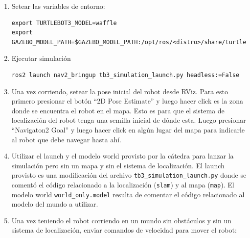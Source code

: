 \documentclass[tp]{lcc}
\begin{document}
\begin{enumerate}

\item Setear las variables de entorno:

\begin{lstlisting}[style=bash] 
export TURTLEBOT3_MODEL=waffle
export GAZEBO_MODEL_PATH=$GAZEBO_MODEL_PATH:/opt/ros/<distro>/share/turtlebot3_gazebo/models
\end{lstlisting}
	\item Ejecutar simulación

\begin{lstlisting}[style=bash] 
ros2 launch nav2_bringup tb3_simulation_launch.py headless:=False
\end{lstlisting}


	\item Una vez corriendo, setear la pose inicial del robot desde RViz. Para esto primero presionar el botón ``2D Pose Estimate'' y luego hacer click es la zona donde se encuentra el robot en el mapa. Esto es para que el sistema de localización del robot tenga una semilla inicial de dónde esta. Luego presionar ``Navigaton2 Goal'' y luego hacer click en algún lugar del mapa para indicarle al robot que debe navegar hasta ahí.

	
	\item Utilizar el launch y el modelo world provisto por la cátedra  para lanzar la simulación pero sin un mapa y sin el sistema de localización. El launch provisto es una modificación del  archivo \lstinline[style=bash]{tb3_simulation_launch.py} donde se comentó el código relacionado a la localización (\lstinline[style=bash]{slam}) y al mapa (\lstinline[style=bash]{map}). El modelo world \lstinline[style=bash]{world_only.model} resulta de comentar el código relacionado al modelo del mundo a utilizar.
	

	\item Una vez teniendo el robot corriendo en un mundo sin obstáculos y sin un sistema de localización, enviar comandos de velocidad para mover el robot:


\end{enumerate}
\end{document}

